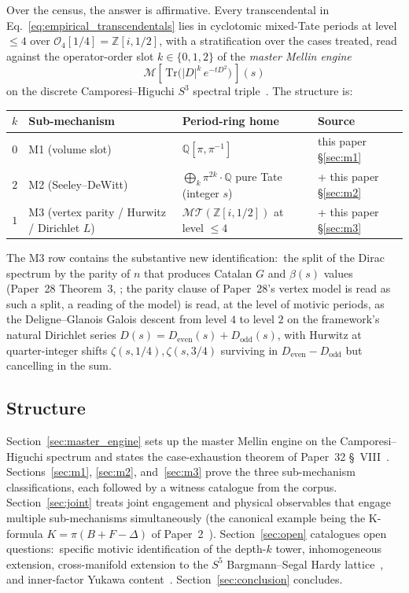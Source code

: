 \documentclass[11pt,a4paper]{article}
\theoremstyle{plain}
\theoremstyle{definition}
\newcommand{\sthree}{S^{3}}
\newcommand{\sfive}{S^{5}}
\newcommand{\Z}{\mathbb{Z}}
\newcommand{\Q}{\mathbb{Q}}
\newcommand{\Tr}{\mathrm{Tr}}
\newcommand{\MT}{\mathcal{MT}}
\newcommand{\Mcal}{\mathcal{M}}
\begin{document}
Over the census, the answer is affirmative.  Every transcendental in
Eq.~\eqref{eq:empirical_transcendentals} lies in cyclotomic mixed-Tate
periods at level $\le 4$ over $\mathcal{O}_4[1/4] = \Z[i, 1/2]$, with
a stratification over the cases treated, read against the operator-order slot
$k \in \{0, 1, 2\}$ of the \emph{master Mellin engine}
\begin{equation}
\label{eq:master_mellin_engine}
\Mcal\!\left[\,\Tr\bigl(|D|^k\, e^{-tD^2}\bigr)\,\right](s)
\end{equation}
on the discrete Camporesi--Higuchi $\sthree$ spectral
triple~\cite{camporesi_higuchi1996}.  The structure is:
\begin{center}
\begin{tabular}{@{}clll@{}}
\toprule
$k$ & Sub-mechanism & Period-ring home & Source \\
\midrule
$0$ & M1 (volume slot) & $\Q[\pi, \pi^{-1}]$ & this paper \S\ref{sec:m1} \\
$2$ & M2 (Seeley--DeWitt) & $\bigoplus_k \pi^{2k}\cdot\Q$ pure Tate (integer $s$) & \cite{fathizadeh_marcolli2016} + this paper \S\ref{sec:m2} \\
$1$ & M3 (vertex parity / Hurwitz / Dirichlet $L$) & $\MT(\Z[i, 1/2])$ at level $\le 4$ & \cite{deligne2010, glanois2015} + this paper \S\ref{sec:m3} \\
\bottomrule
\end{tabular}
\end{center}

The M3 row contains the substantive new identification:\ the
split of the Dirac spectrum by the parity of $n$ that produces Catalan
$G$ and $\beta(s)$ values (Paper~28 Theorem~3, \cite{loutey_paper28};
the parity clause of Paper~28's vertex model is read as such a split,
a reading of the model) is read, at the level of motivic periods, as the Deligne--Glanois Galois descent from level $4$ to level $2$ on the framework's
natural Dirichlet series $D(s) = D_{\mathrm{even}}(s) +
D_{\mathrm{odd}}(s)$, with Hurwitz at quarter-integer shifts
$\zeta(s, 1/4), \zeta(s, 3/4)$ surviving in
$D_{\mathrm{even}} - D_{\mathrm{odd}}$ but cancelling in the sum.

\subsection{Structure}

Section~\ref{sec:master_engine} sets up the master Mellin engine on the
Camporesi--Higuchi spectrum and states the case-exhaustion theorem of
Paper~32 \S~VIII~\cite{loutey_paper32}.  Sections~\ref{sec:m1},
\ref{sec:m2}, and~\ref{sec:m3} prove the three sub-mechanism
classifications, each followed by a witness catalogue from the corpus.
Section~\ref{sec:joint} treats joint engagement and physical observables
that engage multiple sub-mechanisms simultaneously (the canonical
example being the K-formula $K = \pi(B + F - \Delta)$ of
Paper~2~\cite{loutey_paper2}).  Section~\ref{sec:open} catalogues
open questions:\ specific motivic identification of the depth-$k$
tower, inhomogeneous extension, cross-manifold extension to the
$\sfive$ Bargmann--Segal Hardy lattice~\cite{loutey_paper24}, and
inner-factor Yukawa content~\cite{loutey_paper32}.
Section~\ref{sec:conclusion} concludes.
\end{document}
